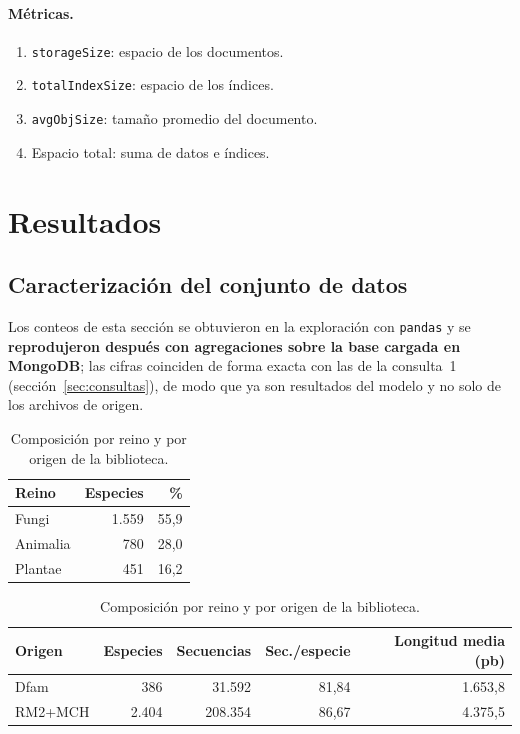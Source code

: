 \documentclass[journal]{IEEEtran}
\begin{document}
\paragraph*{Métricas.}
\begin{enumerate}
  \item \texttt{storageSize}: espacio de los documentos.
  \item \texttt{totalIndexSize}: espacio de los índices.
  \item \texttt{avgObjSize}: tamaño promedio del documento.
  \item Espacio total: suma de datos e índices.
\end{enumerate}

\section{Resultados}

\subsection{Caracterización del conjunto de datos}
\label{sec:caracterizacion}
Los conteos de esta sección se obtuvieron en la exploración con \texttt{pandas} y se
\textbf{reprodujeron después con agregaciones sobre la base cargada en MongoDB}; las cifras
coinciden de forma exacta con las de la consulta~1
(sección~\ref{sec:consultas}), de modo que ya son resultados del modelo y no solo de los
archivos de origen.

\begin{table}[!t]
\caption{Composición por reino y por origen de la biblioteca.}
\label{tab:composicion}
\centering
\footnotesize
\begin{tabular}{@{}lrr@{}}
\toprule
Reino & Especies & \% \\
\midrule
Fungi & 1.559 & 55,9 \\
Animalia & 780 & 28,0 \\
Plantae & 451 & 16,2 \\
\bottomrule
\end{tabular}

\vspace{4pt}
\scriptsize
\setlength{\tabcolsep}{2pt}
\begin{tabular}{@{}lrrrr@{}}
\toprule
Origen & Especies & Secuencias & Sec./especie & Longitud media (pb) \\
\midrule
Dfam & 386 & 31.592 & 81,84 & 1.653,8 \\
RM2+MCH & 2.404 & 208.354 & 86,67 & 4.375,5 \\
\bottomrule
\end{tabular}
\end{table}
\end{document}
